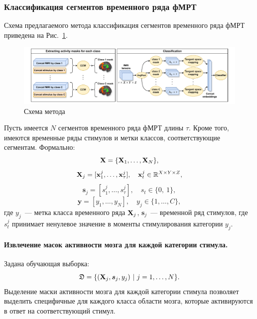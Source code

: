 \subsubsection{Классификация сегментов временного ряда фМРТ}
Схема предлагаемого метода классификация сегментов временного ряда фМРТ приведена на Рис.~\ref{fig:scheme_2}.
\begin{figure}[h!]
	\centering
	\includegraphics[width=1\textwidth]{images/scheme_2.pdf}
	\caption{Схема метода}
	\label{fig:scheme_2}
\end{figure}

Пусть имеется $N$ сегментов временного ряда фМРТ длины $\tau$. Кроме того, имеются временные ряды стимулов и метки классов, соответствующие сегментам. Формально:
	\begin{equation*} 
		\mathbf{X} = \{\mathbf{X}_1,\dots, \mathbf{X}_{N}\},
	\end{equation*}
	\begin{equation*}
		\mathbf{X}_j = [\mathbf{x}_{1}^j, \ldots, \mathbf{x}_{\tau}^j], \quad
		\mathbf{x}_{t}^j \in \mathbb{R}^{X \times Y \times Z},
	\end{equation*}
	$$\bm{s}_j = \left[s_1^j, \dots, s_{\tau}^j\right], \quad s_t \in \{0,~1\},$$
	$$\bm{y} = \left[y_1, \dots, y_{N}\right],\quad y_j \in \{1,\dots, C\},$$
	где $y_j$~--- метка класса временного ряда $\mathbf{X}_j$, $\bm{s}_j$~--- временной ряд стимулов, где $s_t^j$ принимает ненулевое значение в моменты стимулирования категории $y_j$.
 \paragraph*{Извлечение масок активности мозга для каждой категории стимула.}
Задана обучающая выборка:
\[ \mathfrak{D} = \{(\mathbf{X}_{j}, \bm{s}_j, y_j) \ | \ {j} = 1, \ldots, N \}. \]
Выделение маски активности мозга для каждой категории стимула позволяет выделить специфичные для каждого класса области мозга, которые активируются в ответ на соответствующий стимул.

